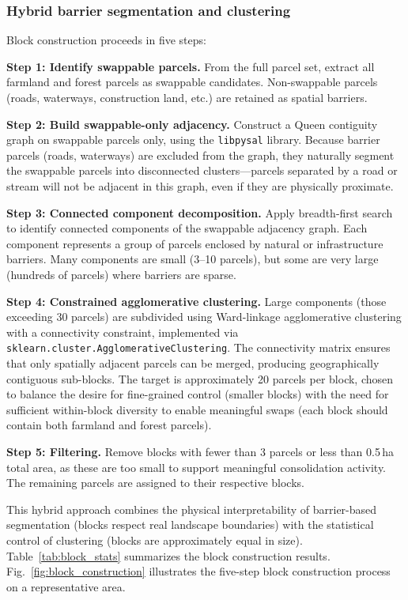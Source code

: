\documentclass[preprint,12pt]{elsarticle}
\begin{document}
\subsubsection{Hybrid barrier segmentation and clustering}

Block construction proceeds in five steps:

\textbf{Step 1: Identify swappable parcels.} From the full parcel set, extract all farmland and forest parcels as swappable candidates. Non-swappable parcels (roads, waterways, construction land, etc.) are retained as spatial barriers.

\textbf{Step 2: Build swappable-only adjacency.} Construct a Queen contiguity graph on swappable parcels only, using the \texttt{libpysal} library. Because barrier parcels (roads, waterways) are excluded from the graph, they naturally segment the swappable parcels into disconnected clusters---parcels separated by a road or stream will not be adjacent in this graph, even if they are physically proximate.

\textbf{Step 3: Connected component decomposition.} Apply breadth-first search to identify connected components of the swappable adjacency graph. Each component represents a group of parcels enclosed by natural or infrastructure barriers. Many components are small (3--10 parcels), but some are very large (hundreds of parcels) where barriers are sparse.

\textbf{Step 4: Constrained agglomerative clustering.} Large components (those exceeding 30 parcels) are subdivided using Ward-linkage agglomerative clustering with a connectivity constraint, implemented via \texttt{sklearn.cluster.AgglomerativeClustering}. The connectivity matrix ensures that only spatially adjacent parcels can be merged, producing geographically contiguous sub-blocks. The target is approximately 20 parcels per block, chosen to balance the desire for fine-grained control (smaller blocks) with the need for sufficient within-block diversity to enable meaningful swaps (each block should contain both farmland and forest parcels).

\textbf{Step 5: Filtering.} Remove blocks with fewer than 3 parcels or less than 0.5\,ha total area, as these are too small to support meaningful consolidation activity. The remaining parcels are assigned to their respective blocks.

This hybrid approach combines the physical interpretability of barrier-based segmentation (blocks respect real landscape boundaries) with the statistical control of clustering (blocks are approximately equal in size). Table~\ref{tab:block_stats} summarizes the block construction results. Fig.~\ref{fig:block_construction} illustrates the five-step block construction process on a representative area.
\end{document}
